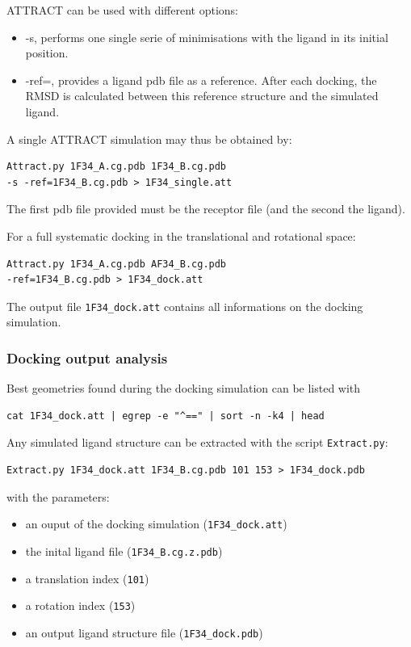 \documentclass[12pt,a4paper]{article}
\begin{document}
ATTRACT can be used with different options:
\begin{itemize}
\item -s, performs one single serie of minimisations with the ligand in its initial position.
\item -ref=, provides a ligand pdb file as a reference. After each docking, the RMSD is calculated between this reference structure and the simulated ligand.
\end{itemize}

A single ATTRACT simulation may thus be obtained by:
\begin{verbatim}
Attract.py 1F34_A.cg.pdb 1F34_B.cg.pdb 
-s -ref=1F34_B.cg.pdb > 1F34_single.att
\end{verbatim}

The first pdb file provided must be the receptor file (and the second the ligand).

For a full systematic docking in the translational and rotational space:
\begin{verbatim}
Attract.py 1F34_A.cg.pdb AF34_B.cg.pdb 
-ref=1F34_B.cg.pdb > 1F34_dock.att
\end{verbatim}

The output file {\tt 1F34\_dock.att} contains all informations on the docking simulation.

\subsubsection{Docking output analysis}

Best geometries found during the docking simulation can be listed with
\begin{verbatim}
cat 1F34_dock.att | egrep -e "^==" | sort -n -k4 | head
\end{verbatim}

Any simulated ligand structure can be extracted with the script {\tt Extract.py}:

\begin{verbatim}
Extract.py 1F34_dock.att 1F34_B.cg.pdb 101 153 > 1F34_dock.pdb
\end{verbatim}

with the parameters:
\begin{itemize}
\item an ouput of the docking simulation ({\tt 1F34\_dock.att})
\item the inital ligand file ({\tt 1F34\_B.cg.z.pdb})
\item a translation index ({\tt 101})
\item a rotation index ({\tt 153})
\item an output ligand structure file ({\tt 1F34\_dock.pdb})
\end{itemize}
\end{document}
